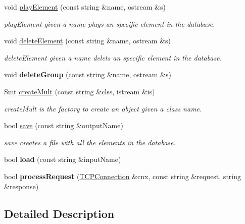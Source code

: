 \begin{DoxyCompactItemize}
void \mbox{\hyperlink{class_store_acf64c23294d6ed1c1c307664751df6d5}{play\+Element}} (const string \&name, ostream \&s)
\begin{DoxyCompactList}\small\item\em play\+Element given a name plays an specific element in the database. \end{DoxyCompactList}\item 
void \mbox{\hyperlink{class_store_adc2051c35c1f083d41c45befa7ed1705}{delete\+Element}} (const string \&name, ostream \&s)
\begin{DoxyCompactList}\small\item\em delete\+Element given a name delets an specific element in the database. \end{DoxyCompactList}\item 
\mbox{\label{class_store_a831850472744da75479fde965ea88e29}} 
void {\bfseries delete\+Group} (const string \&name, ostream \&s)
\item 
Smt \mbox{\hyperlink{class_store_aeb47bc82c25f6383e43707ff2a468f5a}{create\+Mult}} (const string \&clss, istream \&is)
\begin{DoxyCompactList}\small\item\em create\+Mult is the factory to create an object given a class name. \end{DoxyCompactList}\item 
bool \mbox{\hyperlink{class_store_a0762cd9f13a3ec185154dc3a1b2f5fb6}{save}} (const string \&output\+Name)
\begin{DoxyCompactList}\small\item\em save creates a file with all the elements in the database. \end{DoxyCompactList}\item 
\mbox{\label{class_store_ad6d88f738afb50566377094429183bf2}} 
bool {\bfseries load} (const string \&input\+Name)
\item 
\mbox{\label{class_store_aa232b7e346e9054969bf6f3a5314d6f9}} 
bool {\bfseries process\+Request} (\mbox{\hyperlink{classcppu_1_1_t_c_p_connection}{T\+C\+P\+Connection}} \&cnx, const string \&request, string \&response)
\end{DoxyCompactItemize}


\subsection{Detailed Description}


